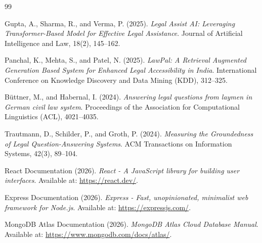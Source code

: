 \documentclass[12pt,a4paper]{report}
\begin{document}


\tableofcontents

\clearpage

\listoffigures

\clearpage

\listoftables

\clearpage



\setcounter{page}{1}








\begin{thebibliography}{99}

Gupta, A., Sharma, R., and Verma, P. (2025).
\textit{Legal Assist AI: Leveraging Transformer-Based Model for Effective Legal Assistance}. Journal of Artificial Intelligence and Law, 18(2), 145--162.

Panchal, K., Mehta, S., and Patel, N. (2025).
\textit{LawPal: A Retrieval Augmented Generation Based System for Enhanced Legal Accessibility in India}. International Conference on Knowledge Discovery and Data Mining (KDD), 312--325.

Büttner, M., and Habernal, I. (2024).
\textit{Answering legal questions from laymen in German civil law system}. Proceedings of the Association for Computational Linguistics (ACL), 4021--4035.

Trautmann, D., Schilder, P., and Groth, P. (2024).
\textit{Measuring the Groundedness of Legal Question-Answering Systems}. ACM Transactions on Information Systems, 42(3), 89--104.

React Documentation (2026).
\textit{React - A JavaScript library for building user interfaces}. Available at: \url{https://react.dev/}.

Express Documentation (2026).
\textit{Express - Fast, unopinionated, minimalist web framework for Node.js}. Available at: \url{https://expressjs.com/}.

MongoDB Atlas Documentation (2026).
\textit{MongoDB Atlas Cloud Database Manual}. Available at: \url{https://www.mongodb.com/docs/atlas/}.

\end{thebibliography}
\end{document}
